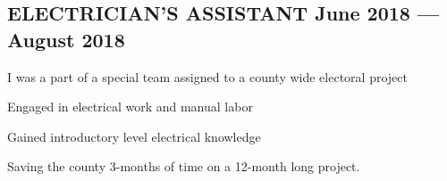 \documentclass[letter,10pt]{article}
\begin{document}
\subsection{{ELECTRICIAN’S ASSISTANT \hfill June 2018 --- August 2018}}
\begin{zitemize}
\item I was a part of a special team assigned to a county wide electoral project
\item Engaged in electrical work and manual labor
\item Gained introductory level electrical knowledge
\item Saving the county 3-months of time on a 12-month long project.
\end{zitemize}


\end{document}
